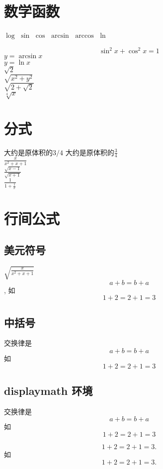 \documentclass{ctexart}
\begin{document}
	\section{数学函数}
	$\log$
	$\sin$
	$\cos$
	$\arcsin$
	$\arccos$
	$\ln$
	
	$$\sin^2x+\cos^2x=1$$ 
	$y = \arcsin x$ \\
	$y=\ln x $ \\
	
	$\sqrt{2} $ \\
	$\sqrt{x^2 + y^2}$ \\
	$\sqrt{2+\sqrt{2}} $\\
	
	$\sqrt[4]{x} $
	
	
	\section{分式}	
	大约是原体积的$3/4$ 
	大约是原体积的$\frac{3}{4}$ 
	\\
	$\frac{x}{x^2+x+1}$
	\\
	$\frac{\sqrt{x-1}}{\sqrt{x+1}} $
	\\
	$\frac{1}{1+\frac{1}{x}}$ 
	\\
	
	\section{行间公式}
	\subsection{美元符号}
		$\sqrt{\frac{x}{x^2+x+1}}$\\
	$$ a+b=b+a $$,
	如 $$1+2=2+1=3 $$
	\subsection{中括号}
	交换律是
	\[a+b=b+a\]
	如
	\[1+2=2+1=3 \]
	
	\subsection{displaymath 环境}
	
		交换律是
	\[a+b=b+a\]
	如
	\[1+2=2+1=3 \]
	
	\begin{displaymath}
		1+2=2+1=3 . 
	\end{displaymath}
	如
	\begin{displaymath}
		1+2=2+1=3. 
	\end{displaymath}
	
\end{document}
